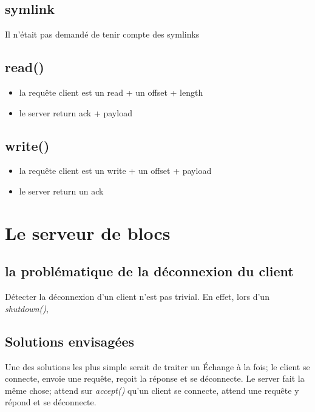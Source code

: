 \documentclass[a4paper,12pt]{article}
\begin{document}
\subsection{symlink}

Il n'était pas demandé de tenir compte des symlinks 



\subsection*{read()}

\begin{itemize}
\item la requête client est un read + un offset + length
\item le server return ack + payload
\end{itemize}

\subsection*{write()}

\begin{itemize}
\item la requête client est un write + un offset + payload
\item le server return un ack
\end{itemize}


\vspace{1cm}

\section{Le serveur de blocs}


\subsection*{la problématique de la déconnexion du client}

Détecter la déconnexion d'un client n'est pas trivial. En effet, lors d'un \emph{shutdown()}, 


\subsection*{Solutions envisagées}

Une des solutions les plus simple serait de traiter un Échange à  la fois; le client se connecte, envoie une requête, reçoit la réponse et se déconnecte. Le server fait la même chose; attend sur \emph{accept()} qu'un client se connecte, attend une requête y répond et se déconnecte.\\
\end{document}

